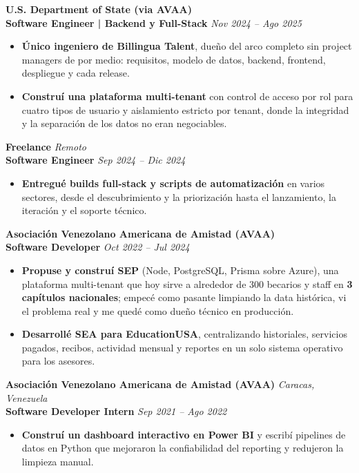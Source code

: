 \documentclass[11pt]{article}
\begin{document}
\vspace{10pt}
\textbf{U.S. Department of State (via AVAA)} \\
\textbf{Software Engineer | Backend y Full-Stack} \hfill \textit{Nov 2024 -- Ago 2025}
\begin{itemize}
    \item \textbf{Único ingeniero de Billingua Talent}, dueño del arco completo sin project managers de por medio: requisitos, modelo de datos, backend, frontend, despliegue y cada release.
    \item \textbf{Construí una plataforma multi-tenant} con control de acceso por rol para cuatro tipos de usuario y aislamiento estricto por tenant, donde la integridad y la separación de los datos no eran negociables.
\end{itemize}

\vspace{10pt}
\textbf{Freelance} \hfill \textit{Remoto} \\
\textbf{Software Engineer} \hfill \textit{Sep 2024 -- Dic 2024}
\begin{itemize}
    \item \textbf{Entregué builds full-stack y scripts de automatización} en varios sectores, desde el descubrimiento y la priorización hasta el lanzamiento, la iteración y el soporte técnico.
\end{itemize}

\vspace{10pt}
\textbf{Asociación Venezolano Americana de Amistad (AVAA)} \\
\textbf{Software Developer} \hfill \textit{Oct 2022 -- Jul 2024}
\begin{itemize}
    \item \textbf{Propuse y construí SEP} (Node, PostgreSQL, Prisma sobre Azure), una plataforma multi-tenant que hoy sirve a alrededor de 300 becarios y staff en \textbf{3 capítulos nacionales}; empecé como pasante limpiando la data histórica, vi el problema real y me quedé como dueño técnico en producción.
    \item \textbf{Desarrollé SEA para EducationUSA}, centralizando historiales, servicios pagados, recibos, actividad mensual y reportes en un solo sistema operativo para los asesores.
\end{itemize}

\vspace{10pt}
\textbf{Asociación Venezolano Americana de Amistad (AVAA)} \hfill \textit{Caracas, Venezuela} \\
\textbf{Software Developer Intern} \hfill \textit{Sep 2021 -- Ago 2022}
\begin{itemize}
    \item \textbf{Construí un dashboard interactivo en Power BI} y escribí pipelines de datos en Python que mejoraron la confiabilidad del reporting y redujeron la limpieza manual.
\end{itemize}
\end{document}
